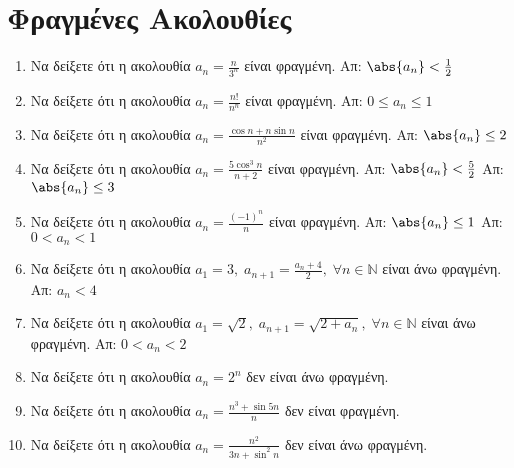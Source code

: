 


\everymath{\displaystyle}
\pagestyle{vangelis}



\begin{center}
\end{center}

\vspace{\baselineskip}


\setcounter{chapter}{1}
\section{Φραγμένες Ακολουθίες}

\begin{enumerate}
    \item Να δείξετε ότι η ακολουθία $ a_{n} = \frac{n}{3^{n}} $ είναι 
        φραγμένη. 
        \hfill Απ: $ \abs{a_{n}}< \frac{1}{2} $
    \item Να δείξετε ότι η ακολουθία $ a_{n} = \frac{n!}{n^{n}} $ είναι 
        φραγμένη. 
        \hfill Απ: $ 0 \leq a_{n} \leq 1 $ 
    \item Να δείξετε ότι η ακολουθία $ a_{n} = \frac{\cos{n} + n 
        \sin{n}}{n^{2}} $ είναι φραγμένη. 
        \hfill Απ: $ \abs{a_{n}} \leq 2 $ 
    \item Να δείξετε ότι η ακολουθία $ a_{n} = \frac{5 \cos^{3}{n}}{n+2} $ 
        είναι φραγμένη.
        \hfill Απ: $ \abs{a_{n}} < \frac{5}{2}  $ 
        \hfill Απ: $ \abs{a_{n}} \leq 3 $ 
    \item Να δείξετε ότι η ακολουθία $ a_{n} = \frac{(-1)^{n}}{n} $ είναι 
        φραγμένη.
        \hfill Απ: $ \abs{a_{n}} \leq 1 $ 
        \hfill Απ: $ 0 < a_{n} < 1 $ 
    \item Να δείξετε ότι η ακολουθία $ a_{1} = 3, \; a_{n+1} =
        \frac{a_{n}+4}{2}, \; \forall n \in \mathbb{N} $ είναι άνω φραγμένη.
        \hfill Απ: $ a_{n} < 4 $ 
    \item Να δείξετε ότι η ακολουθία $ a_{1} = \sqrt{2}, \; a_{n+1} =
        \sqrt{2+ a_{n}}, \; \forall n \in \mathbb{N} $ είναι άνω φραγμένη.
        \hfill Απ: $ 0 < a_{n} < 2$ 
    \item Να δείξετε ότι η ακολουθία $ a_{n} = 2^{n} $ δεν είναι άνω 
        φραγμένη.
    \item Να δείξετε ότι η ακολουθία $ a_{n} = \frac{n^{3} + \sin{5n}}{n} $ δεν είναι 
        φραγμένη.
    \item Να δείξετε ότι η ακολουθία $ a_{n} = \frac{n^{2}}{3n+ \sin^{2}{n}} $ δεν 
        είναι άνω φραγμένη.
\end{enumerate}

